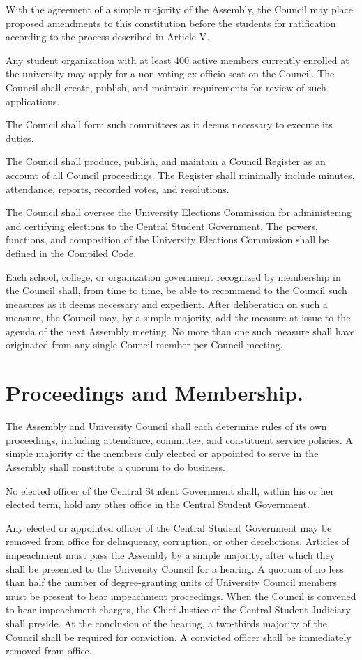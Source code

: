     With the agreement of a simple majority of the Assembly, the Council may place proposed amendments to this constitution before the students for ratification according to the process described in Article V.

    Any student organization with at least 400 active members currently enrolled at the university may apply for a non-voting ex-officio seat on the Council. The Council shall create, publish, and maintain requirements for review of such applications.

    The Council shall form such committees as it deems necessary to execute its duties.

    The Council shall produce, publish, and maintain a Council Register as an account of all Council proceedings. The Register shall minimally include minutes, attendance, reports, recorded votes, and resolutions.

    The Council shall oversee the University Elections Commission for administering and certifying elections to the Central Student Government. The powers, functions, and composition of the University Elections Commission shall be defined in the Compiled Code.

    Each school, college, or organization government recognized by membership in the Council shall, from time to time, be able to recommend to the Council such measures as it deems necessary and expedient. After deliberation on such a measure, the Council may, by a simple majority, add the measure at issue to the agenda of the next Assembly meeting. No more than one such measure shall have originated from any single Council member per Council meeting.

\section{Proceedings and Membership.}
    The Assembly and University Council shall each determine rules of its own proceedings, including attendance, committee, and constituent service policies.  A simple majority of the members duly elected or appointed to serve in the Assembly shall constitute a quorum to do business.

    No elected officer of the Central Student Government shall, within his or her elected term, hold any other office in the Central Student Government.

    Any elected or appointed officer of the Central Student Government may be removed from office for delinquency, corruption, or other derelictions. Articles of impeachment must pass the Assembly by a simple majority, after which they shall be presented to the University Council for a hearing. A quorum of no less than half the number of degree-granting units of University Council members must be present to hear impeachment proceedings. When the Council is convened to hear impeachment charges, the Chief Justice of the Central Student Judiciary shall preside. At the conclusion of the hearing, a two-thirds majority of the Council shall be required for conviction. A convicted officer shall be immediately removed from office.

